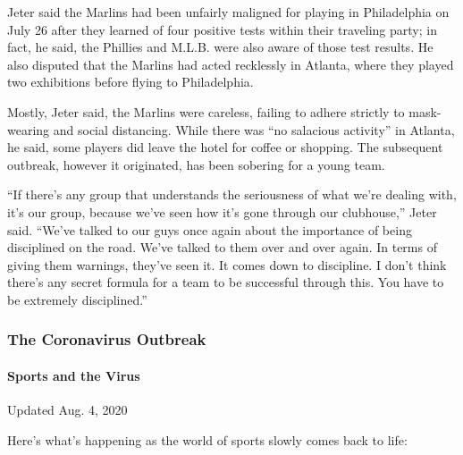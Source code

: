 Jeter said the Marlins had been unfairly maligned for playing in
Philadelphia on July 26 after they learned of four positive tests within
their traveling party; in fact, he said, the Phillies and M.L.B. were
also aware of those test results. He also disputed that the Marlins had
acted recklessly in Atlanta, where they played two exhibitions before
flying to Philadelphia.

Mostly, Jeter said, the Marlins were careless, failing to adhere
strictly to mask-wearing and social distancing. While there was ``no
salacious activity'' in Atlanta, he said, some players did leave the
hotel for coffee or shopping. The subsequent outbreak, however it
originated, has been sobering for a young team.

``If there's any group that understands the seriousness of what we're
dealing with, it's our group, because we've seen how it's gone through
our clubhouse,'' Jeter said. ``We've talked to our guys once again about
the importance of being disciplined on the road. We've talked to them
over and over again. In terms of giving them warnings, they've seen it.
It comes down to discipline. I don't think there's any secret formula
for a team to be successful through this. You have to be extremely
disciplined.''

\hypertarget{the-coronavirus-outbreak}{%
\subsubsection{The Coronavirus
Outbreak}\label{the-coronavirus-outbreak}}

\hypertarget{sports-and-the-virus}{%
\paragraph{Sports and the Virus}\label{sports-and-the-virus}}

Updated Aug. 4, 2020

Here's what's happening as the world of sports slowly comes back to
life:

